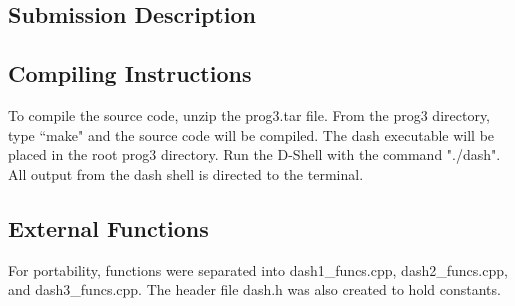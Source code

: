 \begin{multicols}{2}
\section{Submission Description}\label{submission_description}
\subsection{Compiling Instructions}
To compile the source code, unzip the prog3.tar file. From the prog3 directory, type ``make" and the source code will be compiled. The dash executable will be placed in the root prog3 directory. Run the D-Shell with the command "./dash". All output from the dash shell is directed to the terminal.

\subsection{External Functions}
For portability, functions were separated into dash1\_funcs.cpp, dash2\_funcs.cpp, and dash3\_funcs.cpp. The header file dash.h was also created to hold constants.

\end{multicols}

